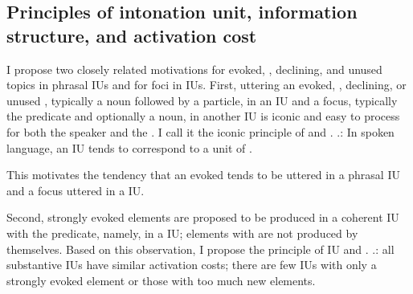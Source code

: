 \subsection{Principles of intonation unit, information structure, and activation cost}

I propose two closely related motivations for evoked, , declining, and unused topics in phrasal IUs and for foci in  IUs.
First,
uttering an evoked, , declining, or unused , typically a noun followed by a  particle, in an IU and
a focus, typically the predicate and optionally a noun, in another IU
is iconic and easy to process for both the speaker and the .
I call it the iconic principle of  and  \Next.
%
\ex.\label{IUIconicP}:
	In spoken language,
	an IU tends to correspond to a unit of .

This motivates the tendency that
an evoked  tends to be uttered in a phrasal IU and
a focus uttered in a  IU.

Second,
strongly evoked elements are proposed to be produced in a coherent IU with the predicate,
namely, in a  IU;
elements with  are not produced by themselves.
Based on this observation,
I propose the principle of IU and .
%
\ex.\label{IUActCostP}:
     all substantive IUs have similar activation costs;
     there are few IUs with only a strongly evoked element or
     those with too much new elements.

